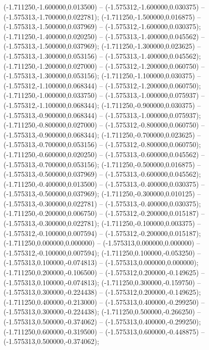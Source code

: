  (-1.711250,-1.600000,0.013500) -- (-1.575312,-1.600000,0.030375) -- (-1.575313,-1.700000,0.022781);
 (-1.711250,-1.500000,0.016875) -- (-1.575313,-1.500000,0.037969) -- (-1.575312,-1.600000,0.030375);
 (-1.711250,-1.400000,0.020250) -- (-1.575313,-1.400000,0.045562) -- (-1.575313,-1.500000,0.037969);
 (-1.711250,-1.300000,0.023625) -- (-1.575313,-1.300000,0.053156) -- (-1.575313,-1.400000,0.045562);
 (-1.711250,-1.200000,0.027000) -- (-1.575312,-1.200000,0.060750) -- (-1.575313,-1.300000,0.053156);
 (-1.711250,-1.100000,0.030375) -- (-1.575312,-1.100000,0.068344) -- (-1.575312,-1.200000,0.060750);
 (-1.711250,-1.000000,0.033750) -- (-1.575313,-1.000000,0.075937) -- (-1.575312,-1.100000,0.068344);
 (-1.711250,-0.900000,0.030375) -- (-1.575313,-0.900000,0.068344) -- (-1.575313,-1.000000,0.075937);
 (-1.711250,-0.800000,0.027000) -- (-1.575312,-0.800000,0.060750) -- (-1.575313,-0.900000,0.068344);
 (-1.711250,-0.700000,0.023625) -- (-1.575313,-0.700000,0.053156) -- (-1.575312,-0.800000,0.060750);
 (-1.711250,-0.600000,0.020250) -- (-1.575313,-0.600000,0.045562) -- (-1.575313,-0.700000,0.053156);
 (-1.711250,-0.500000,0.016875) -- (-1.575313,-0.500000,0.037969) -- (-1.575313,-0.600000,0.045562);
 (-1.711250,-0.400000,0.013500) -- (-1.575313,-0.400000,0.030375) -- (-1.575313,-0.500000,0.037969);
 (-1.711250,-0.300000,0.010125) -- (-1.575313,-0.300000,0.022781) -- (-1.575313,-0.400000,0.030375);
 (-1.711250,-0.200000,0.006750) -- (-1.575312,-0.200000,0.015187) -- (-1.575313,-0.300000,0.022781);
 (-1.711250,-0.100000,0.003375) -- (-1.575312,-0.100000,0.007594) -- (-1.575312,-0.200000,0.015187);
 (-1.711250,0.000000,0.000000) -- (-1.575313,0.000000,0.000000) -- (-1.575312,-0.100000,0.007594);
 (-1.711250,0.100000,-0.053250) -- (-1.575313,0.100000,-0.074813) -- (-1.575313,0.000000,0.000000);
 (-1.711250,0.200000,-0.106500) -- (-1.575312,0.200000,-0.149625) -- (-1.575313,0.100000,-0.074813);
 (-1.711250,0.300000,-0.159750) -- (-1.575313,0.300000,-0.224438) -- (-1.575312,0.200000,-0.149625);
 (-1.711250,0.400000,-0.213000) -- (-1.575313,0.400000,-0.299250) -- (-1.575313,0.300000,-0.224438);
 (-1.711250,0.500000,-0.266250) -- (-1.575313,0.500000,-0.374062) -- (-1.575313,0.400000,-0.299250);
 (-1.711250,0.600000,-0.319500) -- (-1.575313,0.600000,-0.448875) -- (-1.575313,0.500000,-0.374062);
